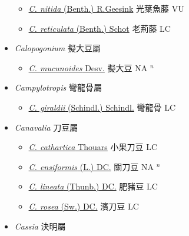 \begin{itemize}
  \begin{itemize}
        \item[] \href{http://www.theplantlist.org/tpl1.1/search?q=Callerya+nitida}{\textit{C. nitida} (Benth.) R.Geesink}   光葉魚藤 VU
        \item[] \href{http://www.theplantlist.org/tpl1.1/search?q=Callerya+reticulata}{\textit{C. reticulata} (Benth.) Schot}   老荊藤 LC
  \end{itemize}
 \item[] \textit{Calopogonium} 擬大豆屬
                    
  \begin{itemize}
        \item[] \href{http://www.theplantlist.org/tpl1.1/search?q=Calopogonium+mucunoides}{\textit{C. mucunoides} Desv.}   擬大豆 NA $^n$
  \end{itemize}
 \item[] \textit{Campylotropis} 彎龍骨屬
                    
  \begin{itemize}
        \item[] \href{http://www.theplantlist.org/tpl1.1/search?q=Campylotropis+giraldii}{\textit{C. giraldii} (Schindl.) Schindl.}   彎龍骨 LC
  \end{itemize}
 \item[] \textit{Canavalia} 刀豆屬
                    
  \begin{itemize}
        \item[] \href{http://www.theplantlist.org/tpl1.1/search?q=Canavalia+cathartica}{\textit{C. cathartica} Thouars}   小果刀豆 LC
        \item[] \href{http://www.theplantlist.org/tpl1.1/search?q=Canavalia+ensiformis}{\textit{C. ensiformis} (L.) DC.}   關刀豆 NA $^n$
        \item[] \href{http://www.theplantlist.org/tpl1.1/search?q=Canavalia+lineata}{\textit{C. lineata} (Thunb.) DC.}   肥豬豆 LC
        \item[] \href{http://www.theplantlist.org/tpl1.1/search?q=Canavalia+rosea}{\textit{C. rosea} (Sw.) DC.}   濱刀豆 LC
  \end{itemize}
 \item[] \textit{Cassia} 決明屬
                    

\end{itemize}
